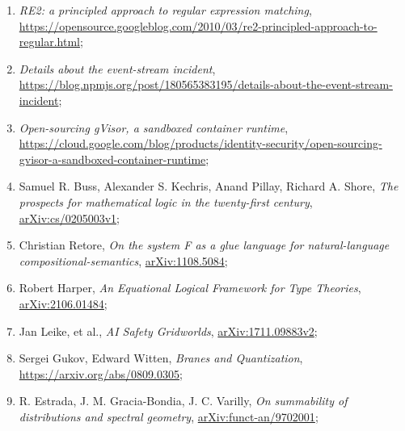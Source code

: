 \documentclass[a4paper,11pt]{article}
\begin{document}
\begin{enumerate}
\item \textit{RE2: a principled approach to regular expression
    matching}, \\
  \href{https://opensource.googleblog.com/2010/03/re2-principled-approach-to-regular.html}{https://opensource.googleblog.com/2010/03/re2-principled-approach-to-regular.html};

\item \textit{Details about the event-stream incident}, \\
  \href{https://blog.npmjs.org/post/180565383195/details-about-the-event-stream-incident}{https://blog.npmjs.org/post/180565383195/details-about-the-event-stream-incident};

\item \textit{Open-sourcing gVisor, a sandboxed container runtime}, \\
  \href{https://cloud.google.com/blog/products/identity-security/open-sourcing-gvisor-a-sandboxed-container-runtime}{https://cloud.google.com/blog/products/identity-security/open-sourcing-gvisor-a-sandboxed-container-runtime};

\item Samuel R. Buss, Alexander S. Kechris, Anand Pillay, Richard A.
  Shore, \textit{The prospects for mathematical logic in the
    twenty-first century},
  \href{https://arxiv.org/abs/cs/0205003v1}{arXiv:cs/0205003v1};

\item Christian Retore, \textit{On the system F as a glue language for
    natural-language compositional-semantics},
  \href{https://arxiv.org/abs/1108.5084}{arXiv:1108.5084};

\item Robert Harper, \textit{An Equational Logical Framework for Type
    Theories},
  \href{https://arxiv.org/abs/2106.01484}{arXiv:2106.01484};

\item Jan Leike, et al., \textit{AI Safety Gridworlds},
  \href{https://arxiv.org/abs/1711.09883}{arXiv:1711.09883v2};

\item Sergei Gukov, Edward Witten, \textit{Branes and Quantization},
  \href{https://arxiv.org/abs/0809.0305}{https://arxiv.org/abs/0809.0305};

\item R. Estrada, J. M. Gracia-Bondia, J. C. Varilly, \textit{On
    summability of distributions and spectral geometry},
  \href{https://arxiv.org/abs/funct-an/9702001v1}{arXiv:funct-an/9702001};


\end{enumerate}
\end{document}
